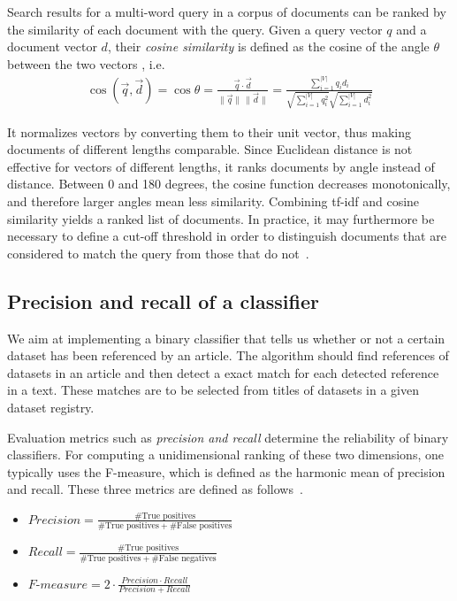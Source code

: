 \documentclass{IOS-Book-Article}
\begin{document}
Search results for a multi-word query in a corpus of documents can be ranked by the similarity of each document with the query.
Given a query vector $q$ and a document vector $d$, their \emph{cosine similarity} is defined as the cosine of the angle $\theta$ between the two vectors \citep{SALTON1988,ChristopherD1999}, i.e.\
\begin{align*}
  \cos(\vec{q},\vec{d})=\cos \theta=\frac{\vec{q}\cdot \vec{d}}{\|\vec{q}\|\,\|\vec{d}\|}=
  \frac{\sum_{i=1}^{|V|} q_id_i}{\sqrt{\sum_{i=1}^{|V|} q_i^2}\sqrt{\sum_{i=1}^{|V|} d_i^2}}
\end{align*}

It normalizes vectors by converting them to their unit vector, thus making documents of different lengths comparable.
Since Euclidean distance is not effective for vectors of different lengths, it ranks documents by angle instead of distance.
Between 0 and 180 degrees, the cosine function decreases monotonically, and therefore larger angles mean less similarity.
Combining tf-idf and cosine similarity yields a ranked list of documents.
In practice, it may furthermore be necessary to define a cut-off threshold in order to distinguish documents that are considered to match the query from those that do not~\citep{Joachims1997}.

\subsection{Precision and recall of a classifier}
\label{sec:precision-recall}
We aim at implementing a binary classifier that tells us whether or not a certain dataset has been referenced by an article.
The algorithm should find references of datasets in an article and then detect a exact match for each detected reference in a text.
These matches are to be selected from titles of datasets in a given dataset registry.

Evaluation metrics such as \emph{precision and recall} determine the reliability of binary classifiers.
For computing a unidimensional ranking of these two dimensions, one typically uses the F-measure, which is defined as the harmonic mean of precision and recall. 
These three metrics are defined as follows~\cite{Powers2011}. 
\begin{itemize}
	\item $\mathit{Precision}=\frac{\#\text{True\ positives}}{\#\text{True positives}+\#\text{False positives}}$
	\item $\mathit{Recall}=\frac{\#\text{True positives}}{\#\text{True positives}+\#\text{False negatives}}$
	\item $\textit{F-measure}=2\cdot{\frac{\mathit{Precision}\cdot\mathit{Recall}}{\mathit{Precision}+\mathit{Recall}}}$
\end{itemize}
\end{document}

